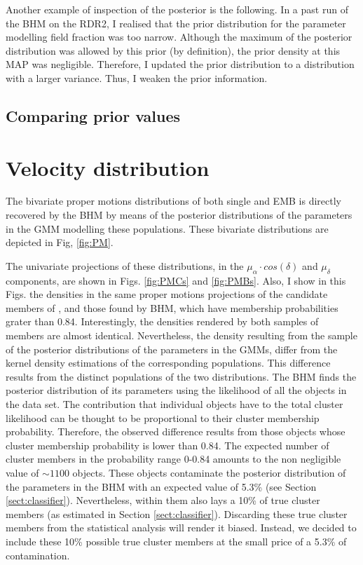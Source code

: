 Another example of inspection of the posterior is the following. In a past run of the BHM on the RDR2, I realised that the prior distribution for the parameter modelling field fraction was too narrow. Although the maximum of the posterior distribution was allowed by this prior (by definition), the prior density at this MAP was negligible. Therefore, I updated the prior distribution to a distribution with a larger variance. Thus, I weaken the prior information.
\subsection{Comparing prior values}


\section{Velocity distribution}
The bivariate proper motions distributions of both single and EMB is directly recovered by the BHM by means of the posterior distributions of the parameters in the GMM modelling these populations.
These bivariate distributions are depicted in Fig, \ref{fig:PM}.

The univariate projections of these distributions, in the $\mu_{\alpha}\cdot cos(\delta)$ and $\mu_{\delta}$ components, are shown in Figs. \ref{fig:PMCs} and \ref{fig:PMBs}. Also, I show in this Figs. the densities in the same proper motions projections of the candidate members of \citet{Bouy2015}, and those found by BHM, which have membership probabilities grater than 0.84. Interestingly, the densities rendered by both samples of members are almost identical. Nevertheless, the density resulting from the sample of the posterior distributions of the parameters in the GMMs, differ from the kernel density estimations of the corresponding populations. This difference results from the distinct populations of the two distributions. The BHM finds the posterior distribution of its parameters using the likelihood of all the objects in the data set. The contribution that individual objects have to the total cluster likelihood can be thought to be proportional to their cluster membership probability. Therefore, the observed difference results from those objects whose cluster membership probability is lower than 0.84. The expected number of cluster members in the probability range 0-0.84 amounts to the non negligible value of $\sim 1100$ objects. These objects contaminate the posterior distribution of the parameters in the BHM with an expected value of 5.3\% (see Section \ref{sect:classifier}). Nevertheless, within them also lays a 10\% of true cluster members (as estimated in Section \ref{sect:classifier}). Discarding these true cluster members from the statistical analysis will render it biased. Instead, we decided to include these 10\% possible true cluster members at the small price of a 5.3\% of contamination.


